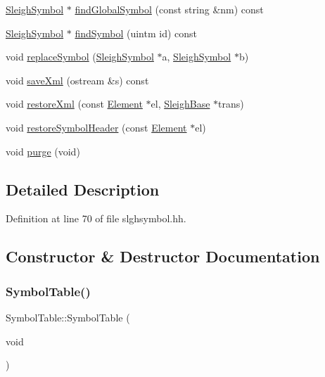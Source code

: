 \begin{DoxyCompactItemize}
\item 
\mbox{\hyperlink{class_sleigh_symbol}{Sleigh\+Symbol}} $\ast$ \mbox{\hyperlink{class_symbol_table_aed0e996f3d74f5a369fdc66ac410add2}{find\+Global\+Symbol}} (const string \&nm) const
\item 
\mbox{\hyperlink{class_sleigh_symbol}{Sleigh\+Symbol}} $\ast$ \mbox{\hyperlink{class_symbol_table_aa4fcf3260ef36229e7a1ba1a89a2cf15}{find\+Symbol}} (uintm id) const
\item 
void \mbox{\hyperlink{class_symbol_table_abb39dd66d5ca2d581be14628c7e596da}{replace\+Symbol}} (\mbox{\hyperlink{class_sleigh_symbol}{Sleigh\+Symbol}} $\ast$a, \mbox{\hyperlink{class_sleigh_symbol}{Sleigh\+Symbol}} $\ast$b)
\item 
void \mbox{\hyperlink{class_symbol_table_a9b483237599214e761b8724ef50dd691}{save\+Xml}} (ostream \&s) const
\item 
void \mbox{\hyperlink{class_symbol_table_a015f2273420eca3b76e82bab4b006ddc}{restore\+Xml}} (const \mbox{\hyperlink{class_element}{Element}} $\ast$el, \mbox{\hyperlink{class_sleigh_base}{Sleigh\+Base}} $\ast$trans)
\item 
void \mbox{\hyperlink{class_symbol_table_aeb92078f011975c7da3a906187baed21}{restore\+Symbol\+Header}} (const \mbox{\hyperlink{class_element}{Element}} $\ast$el)
\item 
void \mbox{\hyperlink{class_symbol_table_ac10fcbcf54614b127d5817f8c43a2cc3}{purge}} (void)
\end{DoxyCompactItemize}


\subsection{Detailed Description}


Definition at line 70 of file slghsymbol.\+hh.



\subsection{Constructor \& Destructor Documentation}
\mbox{\label{class_symbol_table_ab291d6d0a49c3dc33969f2852b7fe9ce}} 
\subsubsection{\texorpdfstring{SymbolTable()}{SymbolTable()}}
{\footnotesize\ttfamily Symbol\+Table\+::\+Symbol\+Table (\begin{DoxyParamCaption}\item[{void}]{ }\end{DoxyParamCaption})\hspace{0.3cm}{\ttfamily [inline]}}



